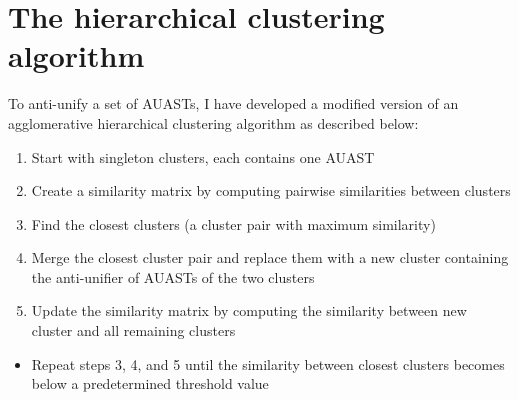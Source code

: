 


\section{The hierarchical clustering algorithm} \label{clustering-alg}
To anti-unify a set of AUASTs, I have developed a modified version of an agglomerative hierarchical clustering algorithm as described below:

\begin{enumerate} [leftmargin=.5in]
\item Start with singleton clusters, each contains one AUAST
\item Create a similarity matrix by computing pairwise similarities between clusters
\item Find the closest clusters (a cluster pair with maximum similarity)
\item Merge the closest cluster pair and replace them with a new cluster containing the anti-unifier of AUASTs of the two clusters
\item Update the similarity matrix by computing the similarity between new cluster and all remaining clusters
\end{enumerate}
\begin{itemize} [leftmargin=.5in]
\item Repeat steps 3, 4, and 5 until the similarity between closest clusters becomes below a predetermined threshold value
\end{itemize}


